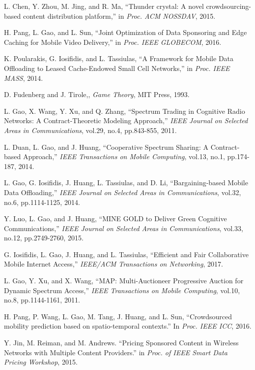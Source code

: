 \begin{thebibliography}{99}
L. Chen, Y. Zhou, M. Jing, and R. Ma, ``Thunder crystal: A novel crowdsourcing-based content distribution platform,''
in \emph{Proc. ACM NOSSDAV}, 2015.

H. Pang, L. Gao, and L. Sun, ``Joint Optimization of Data Sponsoring and Edge Caching for Mobile Video Delivery,''
in \emph{Proc. IEEE GLOBECOM}, 2016.

K. Poularakis, G. Iosifidis, and L. Tassiulas, ``A Framework for Mobile Data Offloading to Leased Cache-Endowed Small Cell Networks,''
in \emph{Proc. IEEE MASS}, 2014.


D. Fudenberg and J. Tirole,, \emph{Game Theory}, MIT Press, 1993. 


L. Gao, X. Wang, Y. Xu, and Q. Zhang, ``Spectrum Trading in Cognitive Radio Networks: A Contract-Theoretic Modeling Approach,'' \emph{IEEE Journal on Selected Areas in Communications}, vol.29, no.4, pp.843-855, 2011.

L. Duan, L. Gao, and J. Huang, ``Cooperative Spectrum Sharing: A Contract-based Approach,'' 
\emph{IEEE Transactions on Mobile Computing}, vol.13, no.1, pp.174-187, 2014. 

L. Gao, G. Iosifidis, J. Huang, L. Tassiulas, and D. Li, ``Bargaining-based Mobile Data Offloading,'' \emph{IEEE Journal on Selected Areas in Communications}, vol.32, no.6, pp.1114-1125, 2014.


Y. Luo, L. Gao, and J. Huang, ``MINE GOLD to Deliver Green Cognitive Communications,'' \emph{IEEE Journal on Selected Areas in Communications}, vol.33, no.12, pp.2749-2760, 2015. 

G. Iosifidis, L. Gao, J. Huang, and L. Tassiulas, ``Efficient and Fair Collaborative Mobile Internet Access,'' \emph{IEEE/ACM Transactions on Networking},  2017. 


L. Gao, Y. Xu, and X. Wang, ``MAP: Multi-Auctioneer Progressive Auction for Dynamic Spectrum Access,'' \emph{IEEE Transactions on Mobile Computing}, vol.10, no.8, pp.1144-1161,  2011.


H. Pang, P. Wang, L. Gao, M. Tang, J. Huang, and L. Sun, ``Crowdsourced mobility prediction based on spatio-temporal contexts.'' In \emph{Proc. IEEE ICC}, 2016.

Y. Jin, M. Reiman, and M. Andrews. ``Pricing Sponsored Content in Wireless Networks with Multiple Content Providers.'' in \emph{Proc. of IEEE Smart Data Pricing Workshop}, 2015.




\end{thebibliography}
